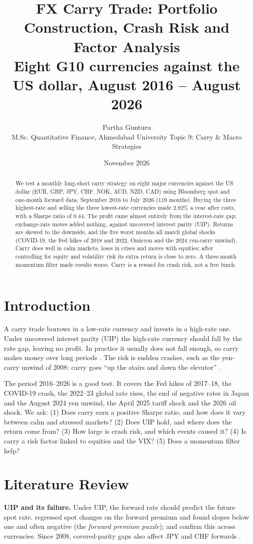 \documentclass[11pt,a4paper]{article}
\title{\textbf{FX Carry Trade: Portfolio Construction, Crash Risk and Factor Analysis}\\[0.3em]
\large Eight G10 currencies against the US dollar, August 2016 -- August 2026}
\author{Partha Gunturu\\ \small M.Sc. Quantitative Finance, Ahmedabad University \quad Topic 9: Carry \& Macro Strategies}
\date{November 2026}
\begin{document}
\maketitle

\begin{abstract}
\noindent We test a monthly long-short carry strategy on eight major currencies against the US dollar (EUR, GBP, JPY, CHF,
NOK, AUD, NZD, CAD) using Bloomberg spot and one-month forward data, September 2016 to July 2026 (119 months). Buying the
three highest-rate and selling the three lowest-rate currencies made 2.92\% a year after costs, with a Sharpe ratio of 0.44.
The profit came almost entirely from the interest-rate gap; exchange-rate moves added nothing, against uncovered interest
parity (UIP). Returns are skewed to the downside, and the five worst months all match global shocks (COVID-19, the Fed hikes
of 2018 and 2022, Omicron and the 2024 yen-carry unwind). Carry does well in calm markets, loses in crises and moves with
equities; after controlling for equity and volatility risk its extra return is close to zero. A three-month momentum filter
made results worse. Carry is a reward for crash risk, not a free lunch.
\end{abstract}

\section{Introduction}
A carry trade borrows in a low-rate currency and invests in a high-rate one. Under uncovered interest parity (UIP) the
high-rate currency should fall by the rate gap, leaving no profit. In practice it usually does not fall enough, so carry
makes money over long periods \citep{fama1984,engel1996,lrv2011}. The risk is sudden crashes, such as the yen-carry unwind
of 2008: carry goes ``up the stairs and down the elevator'' \citep{bnp2009}.

The period 2016--2026 is a good test. It covers the Fed hikes of 2017--18, the COVID-19 crash, the 2022--23 global rate
rises, the end of negative rates in Japan and the August 2024 yen unwind, the April 2025 tariff shock and the 2026 oil
shock. We ask: (1) Does carry earn a positive Sharpe ratio, and how does it vary between calm and stressed markets?
(2) Does UIP hold, and where does the return come from? (3) How large is crash risk, and which events caused it?
(4) Is carry a risk factor linked to equities and the VIX? (5) Does a momentum filter help?

\section{Literature Review}
\textbf{UIP and its failure.} Under UIP, the forward rate should predict the future spot rate. \citet{fama1984} regressed
spot changes on the forward premium and found slopes below one and often negative (the \emph{forward premium puzzle});
\citet{hansenhodrick1980} and \citet{engel1996} confirm this across currencies. Since 2008, covered-parity gaps also affect
JPY and CHF forwards \citep{dtv2018}.
\end{document}
